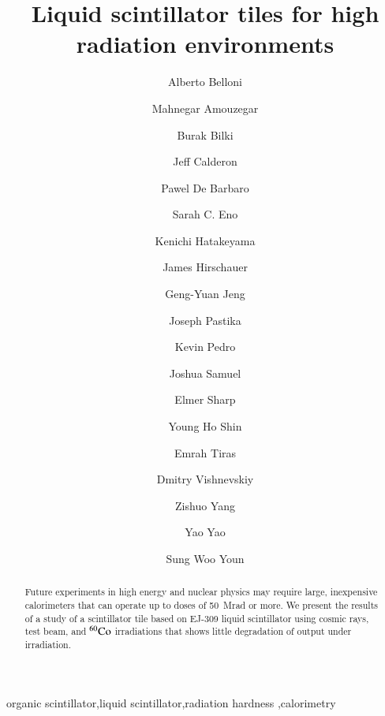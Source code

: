 \documentclass[review]{elsarticle}
\begin{document}
\begin{frontmatter}

\title{Liquid scintillator tiles for high radiation environments }


\author[umd]{Alberto Belloni}
\author[umd]{Mahnegar Amouzegar}
\author[iowa]{Burak Bilki}
\author[umd]{Jeff Calderon}
\author[rochester]{Pawel De Barbaro}
\author[umd]{Sarah C. Eno}
\author[baylor]{Kenichi Hatakeyama}
\author[fnal]{James Hirschauer}
\author[umd]{Geng-Yuan Jeng}
\author[baylor]{Joseph Pastika}
\author[fnal]{Kevin Pedro}
\author[umd]{Joshua Samuel}
\author[elmer]{Elmer Sharp}
\author[umd]{Young Ho Shin}
\author[baylor]{Emrah Tiras}
\author[rochester]{Dmitry Vishnevskiy}
\author[umd]{Zishuo Yang}
\author[umd]{Yao Yao}
\author[korea]{Sung Woo Youn}




\address[umd]{Dept. Physics, U. Maryland, College Park MD 30742 USA}
\address[eljen]{Eljen Technology, 1300 W. Broadway, Sweetwater, TX 79556 USA}
\address[korea]{Institute for Basic Science, Center for Axion and Precision Physics Research, IBS Center for Axion and Precision Physics Research
Room 4315, Department of Physics, Natural Science Building (E6-2), KAIST,
291 Daehak-ro, Yuseong-gu, Daejeon 305-701, South Korea}
\address[elmer]{Elmer Sharp Engineering, 7007 Leesville Blvd. Springfield, VA 22151}
\address[fnal]{Fermi National Accelerator Laboratory, Batavia, IL, USA}
\address[baylor]{Baylor University, Waco, Texas, USA}
\address[iowa]{The University of Iowa, Iowa City, IA, USA}
\address[rochester]{The University of Rochester, Rochester, NY, USA}

\begin{abstract}
Future experiments in high energy and nuclear physics may require
large, inexpensive calorimeters that can operate up to doses of 50~Mrad
or more. We present the results of a study of a scintillator tile
based on EJ-309 liquid scintillator using cosmic rays, test beam, and
$\rm{^{60}Co}$ irradiations that shows little degradation of output
under irradiation.
\end{abstract}

\begin{keyword}
organic scintillator\sep liquid scintillator\sep radiation
hardness \sep calorimetry
\end{keyword}

\end{frontmatter}
\end{document}
